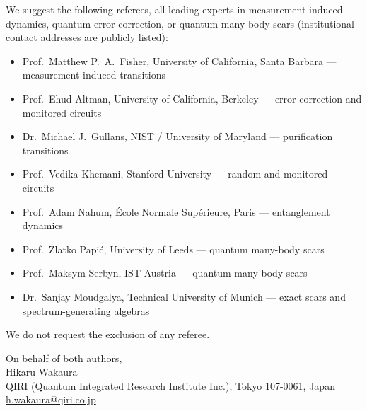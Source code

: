 \documentclass[11pt]{article}
\begin{document}
\vspace{0.5em}

\noindent We suggest the following referees, all leading experts in
measurement-induced dynamics, quantum error correction, or quantum many-body
scars (institutional contact addresses are publicly listed):

\begin{itemize}\itemsep2pt
  \item Prof.\ Matthew P.~A.\ Fisher, University of California, Santa Barbara ---
        measurement-induced transitions
  \item Prof.\ Ehud Altman, University of California, Berkeley ---
        error correction and monitored circuits
  \item Dr.\ Michael J.~Gullans, NIST / University of Maryland ---
        purification transitions
  \item Prof.\ Vedika Khemani, Stanford University --- random and monitored
        circuits
  \item Prof.\ Adam Nahum, \'Ecole Normale Sup\'erieure, Paris --- entanglement
        dynamics
  \item Prof.\ Zlatko Papi\'c, University of Leeds --- quantum many-body scars
  \item Prof.\ Maksym Serbyn, IST Austria --- quantum many-body scars
  \item Dr.\ Sanjay Moudgalya, Technical University of Munich --- exact scars and
        spectrum-generating algebras
\end{itemize}

\noindent We do not request the exclusion of any referee.

\vspace{1em}

\noindent On behalf of both authors,\\
Hikaru Wakaura\\
QIRI (Quantum Integrated Research Institute Inc.), Tokyo 107-0061, Japan\\
\href{mailto:h.wakaura@qiri.co.jp}{h.wakaura@qiri.co.jp}
\end{document}

